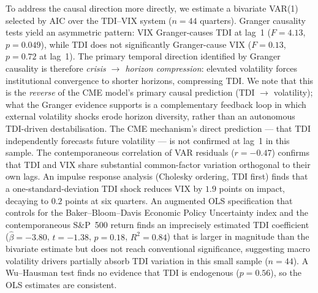 \documentclass[preprint,12pt,authoryear]{elsarticle}
\begin{document}
To address the causal direction more directly, we estimate a bivariate
VAR(1) selected by AIC over the TDI--VIX system ($n = 44$ quarters).
Granger causality tests yield an asymmetric pattern:
VIX Granger-causes TDI at lag~1 ($F = 4.13$, $p = 0.049$), while
TDI does not significantly Granger-cause VIX ($F = 0.13$, $p = 0.72$
at lag~1).
The primary temporal direction identified by Granger causality is therefore
\emph{crisis $\to$ horizon compression}: elevated volatility forces
institutional convergence to shorter horizons, compressing TDI.
We note that this is the \emph{reverse} of the CME model's primary causal
prediction (TDI $\to$ volatility); what the Granger evidence supports is a
complementary feedback loop in which external volatility shocks erode
horizon diversity, rather than an autonomous TDI-driven destabilisation.
The CME mechanism's direct prediction --- that TDI independently forecasts
future volatility --- is not confirmed at lag~1 in this sample.
The contemporaneous correlation of VAR residuals ($r = -0.47$) confirms
that TDI and VIX share substantial common-factor variation orthogonal to
their own lags.
An impulse response analysis (Cholesky ordering, TDI first) finds that
a one-standard-deviation TDI shock reduces VIX by $1.9$ points on
impact, decaying to $0.2$ points at six quarters.
An augmented OLS specification that controls for the Baker--Bloom--Davis
Economic Policy Uncertainty index \citep{baker2016} and the contemporaneous S\&P~500
return finds an imprecisely estimated TDI coefficient
($\hat{\beta} = -3.80$, $t = -1.38$, $p = 0.18$, $R^2 = 0.84$)
that is larger in magnitude than the bivariate estimate but does not
reach conventional significance, suggesting macro volatility drivers
partially absorb TDI variation in this small sample ($n = 44$).
A Wu--Hausman test finds no evidence that TDI is endogenous
($p = 0.56$), so the OLS estimates are consistent.
\end{document}
